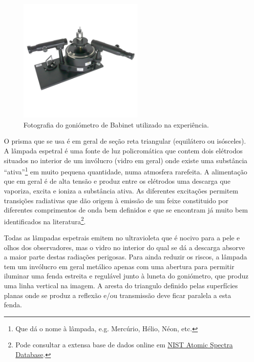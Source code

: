 \documentclass[a4paper,12pt]{article}  %
\begin{document}
\begin{figure}[tb]  
\centering 
	\includegraphics[width=0.55\textwidth]{Espectrometro-Goniometro-S}
	\caption{Fotografia do goniómetro de Babinet utilizado na experiência. \label{fig:spectrometer}} 
\end{figure}




O prisma que se usa é em geral de seção reta triangular (equilátero ou isósceles).
A lâmpada espetral é uma fonte de luz policromática  que contem dois elétrodos situados no interior de um invólucro (vidro em geral) onde existe uma substância “ativa”\footnote{Que dá o nome à lâmpada, e.g. Mercúrio, Hélio, Néon, etc.} em muito pequena quantidade, numa atmosfera rarefeita. A alimentação que em geral é de alta tensão e produz entre os elétrodos uma descarga que vaporiza, excita e ioniza a substância ativa. As diferentes excitações permitem transições radiativas que dão origem à emissão de um feixe constituido por diferentes comprimentos de onda bem definidos e que se encontram já muito bem identificados na literatura\footnote{Pode consultar a extensa base de dados online em  \href{http://physics.nist.gov/asd}{NIST Atomic Spectra Database}.}. 

Todas as lâmpadas espetrais emitem no ultravioleta que é nocivo para a pele e olhos dos observadores, mas o vidro no interior do qual se dá a descarga absorve a maior parte destas radiações perigosas. Para ainda reduzir os riscos, a lâmpada tem um invólucro em geral metálico apenas com uma abertura para permitir iluminar uma fenda estreita e regulável junto à luneta do goniómetro, que produz uma linha vertical na imagem.  A aresta do triangulo  definido pelas superfícies planas onde se produz a reflexão e/ou transmissão deve ficar paralela a esta fenda.
\end{document}
